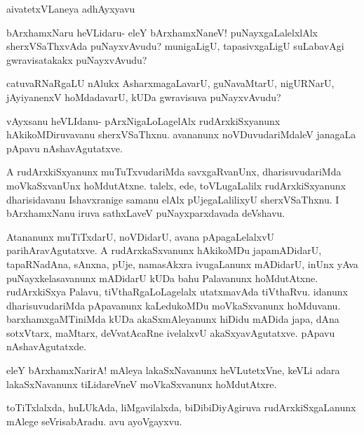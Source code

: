 \documentclass{article}
\begin{document}
\begin{center}
{\textbf\large{aivatetxVLaneya adhAyxyavu}}
\end{center}

\begin{mng}%
bArxhamxNaru heVLidaru- eleY bArxhamxNaneV! puNayxgaLalelxlAlx 
sherxVSaThxvAda puNayxvAvudu? munigaLigU, tapasivxgaLigU suLabavAgi 
gwravisatakakx puNayxvAvudu?
\end{mng}

\begin{mng}%
catuvaRNaRgaLU nAlukx AsharxmagaLavarU, guNavaMtarU, nigURNarU, 
jAyiyanenxV hoMdadavarU, kUDa gwravisuva puNayxvAvudu?
\end{mng}

\begin{mng}%
vAyxsanu heVLIdanu- pArxNigaLoLagelAlx rudArxkiSxyanunx 
hAkikoMDiruvavanu sherxVSaThxnu. avananunx noVDuvudariMdaleV janagaLa 
pApavu nAshavAgutatxve.
\end{mng}

\begin{mng}%
A rudArxkiSxyanunx muTuTxvudariMda savxgaRvanUnx, dharisuvudariMda 
moVkaSxvanUnx hoMdutAtxne. talelx, ede, toVLugaLalilx rudArxkiSxyanunx 
dharisidavanu Ishavxranige samanu elAlx pUjegaLalilixyU sherxVSaThxnu. 
I bArxhamxNanu iruva sathxLaveV puNayxparxdavada deVshavu.
\end{mng}

\begin{mng}%
Atananunx muTiTxdarU, noVDidarU, avana pApagaLelalxvU 
parihAravAgutatxve. A rudArxkaSxvanunx hAkikoMDu japamADidarU, 
tapaRNadAna, sAnxna, pUje, namasAkxra ivugaLanunx mADidarU, inUnx yAva 
puNayxkelasavanunx mADidarU kUDa bahu Palavanunx hoMdutAtxne. 
rudArxkiSxya Palavu, tiVthaRgaLoLagelalx utatxmavAda tiVthaRvu. 
idanunx dharisuvudariMda pApavanunx kaLedukoMDu moVkaSxvanunx 
hoMduvanu. barxhamxgaMTiniMda kUDa akaSxmAleyanunx hiDidu mADida japa, 
dAna sotxVtarx, maMtarx, deVvatAcaRne ivelalxvU akaSxyavAgutatxve. 
pApavu nAshavAgutatxde.
\end{mng}

\begin{mng}%
eleY bArxhamxNarirA! mAleya lakaSxNavanunx heVLutetxVne, keVLi adara 
lakaSxNavanunx tiLidareVneV moVkaSxvanunx hoMdutAtxre.
\end{mng}

\begin{mng}%
toTiTxlalxda, huLUkAda, liMgavilalxda, biDibiDiyAgiruva 
rudArxkiSxgaLanunx mAlege seVrisabAradu. avu ayoVgayxvu.
\end{mng}
\end{document}

